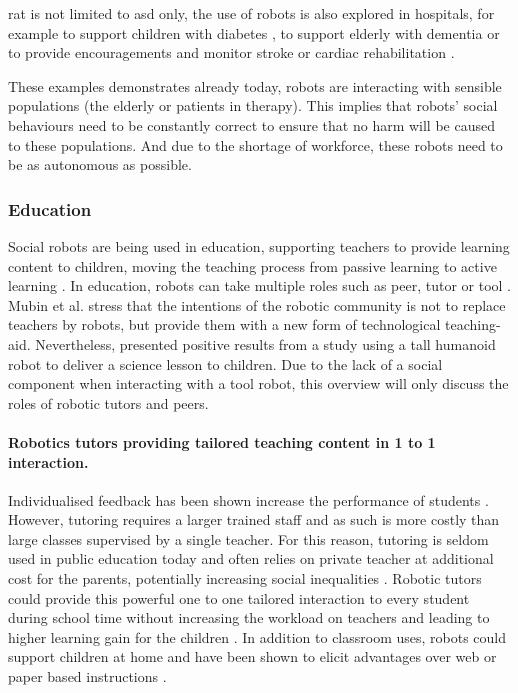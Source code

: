 	\gls{rat} is not limited to \gls{asd} only, the use of robots is also explored in hospitals, for example to support children with diabetes \citep{belpaeme2012multimodal}, to support elderly with dementia \citep{wada2005psychological} or to provide encouragements and monitor stroke \citep{mataric2007socially} or cardiac rehabilitation \citep{lara2017human}.	
	
	These examples demonstrates already today, robots are interacting with sensible populations (the elderly or patients in therapy). This implies that robots' social behaviours need to be constantly correct to ensure that no harm will be caused to these populations. And due to the shortage of workforce, these robots need to be as autonomous as possible.
	
\subsubsection{Education} 
	Social robots are being used in education, supporting teachers to provide learning content to children, moving the teaching process from passive learning to active learning \citep{linder2001facilitating}. In education, robots can take multiple roles such as peer, tutor or tool \citep{mubin2013review}. Mubin et al. stress that the intentions of the robotic community is not to replace teachers by robots, but provide them with a new form of technological teaching-aid. Nevertheless, \cite{verner2016science} presented positive results from a study using a tall humanoid robot to deliver a science lesson to children. Due to the lack of a social component when interacting with a tool robot, this overview will only discuss the roles of robotic tutors and peers.
		
	\paragraph{Robotics tutors providing tailored teaching content in 1 to 1 interaction.} 
	Individualised feedback has been shown increase the performance of students \citep{cohen1982educational,bloom19842}. However, tutoring requires a larger trained staff and as such is more costly than large classes supervised by a single teacher. For this reason, tutoring is seldom used in public education today and often relies on private teacher at additional cost for the parents, potentially increasing social inequalities \citep{bray2009confronting}. Robotic tutors could provide this powerful one to one tailored interaction to every student during school time without increasing the workload on teachers and leading to higher learning gain for the children \citep{kanda2004interactive,leyzberg2012physical,kennedy2016social,gordon2016affective}. In addition to classroom uses, robots could support children at home and have been shown to elicit advantages over web or paper based instructions \citep{han2005educational}. 
	
